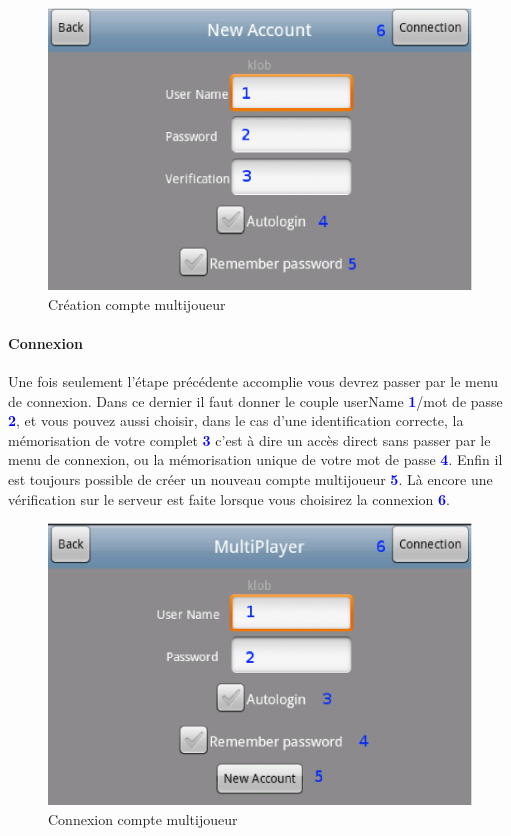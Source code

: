 	
	 \begin{figure}[H]
	\centering
		\includegraphics[scale=0.7]{Manuel/Img/18}
		\caption{Création compte multijoueur}
	\end{figure}
	
	\paragraph{Connexion}
		Une fois seulement l'étape précédente accomplie vous devrez passer par le menu
		de connexion. Dans ce dernier il faut donner le couple
		userName \textcolor{blue}{\textbf{1}}/mot de passe
		\textcolor{blue}{\textbf{2}}, et vous pouvez aussi choisir, dans le cas d'une
		identification correcte, la mémorisation de votre complet
		\textcolor{blue}{\textbf{3}} c'est à dire un accès direct sans passer par le
		menu de connexion, ou la mémorisation unique de votre mot de passe
		\textcolor{blue}{\textbf{4}}. Enfin il est toujours possible de créer un
		nouveau compte multijoueur \textcolor{blue}{\textbf{5}}. Là encore une
		vérification sur le serveur est faite lorsque vous choisirez la connexion
		\textcolor{blue}{\textbf{6}}.
		
	\begin{figure}[H]
	\centering
		\includegraphics[scale=0.7]{Manuel/Img/17}
		\caption{Connexion compte multijoueur}
	\end{figure}
	
